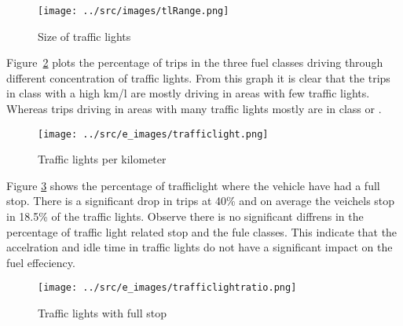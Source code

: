 \begin{figure}[htb]
\centering
\texttt{[image: ../src/images/tlRange.png]}
\caption{Size of traffic lights}
\label{fig:traffclightsize}
\end{figure}


Figure~\ref{fig:traffclight} plots the percentage of trips in the three fuel classes driving through different concentration of traffic lights. 
From this graph it is clear that the trips in class \fuelHigh with a high km/l are mostly driving in areas with few traffic lights. 
Whereas trips driving in areas with many traffic lights mostly are in class \fuelMedium or \fuelLow.

\begin{figure}[htb]
\centering
\texttt{[image: ../src/e\_images/trafficlight.png]}
\caption{Traffic lights per kilometer}
\label{fig:traffclight}
\end{figure}

Figure \ref{fig:trafficlightratio} shows the percentage of trafficlight where the vehicle have had a full stop. There is a significant drop in trips at 40\% and on average the veichels stop in 18.5\% of the traffic lights. %
Observe there is no significant diffrens in the percentage of traffic light related stop and the fule classes. This indicate that the accelration and idle time in traffic lights do not have a significant impact on the fuel effeciency.

\begin{comment}
From Figure \ref{fig:traffclightred} we observe that no trip in class \fuelHigh have more than $0.8$ stops related to traffic light pr km. 
But from Figure \ref{fig:traffclightgreen} we observe that this do not hold for driving through traffic lights without stopping. 
This indicates that while a high concentraion of traffic lights is bad for the fuel economy, it is the full stop behavior that costs the most.

\begin{figure}[htb]
\centering
\texttt{[image: ../src/e\_images/trafficlightgreen.png]}
\caption{Traffic lights without stoping per kilometer}
\label{fig:traffclightgreen}
\end{figure}

\begin{figure}[htb]
\centering
\texttt{[image: ../src/e\_images/trafficlightred.png]}
\caption{Traffic lights with full stop per kilometer}
\label{fig:traffclightred}
\end{figure}
\end{comment}

\begin{figure}[htb]
\centering
\texttt{[image: ../src/e\_images/trafficlightratio.png]}
\caption{Traffic lights with full stop}
\label{fig:trafficlightratio}
\end{figure}